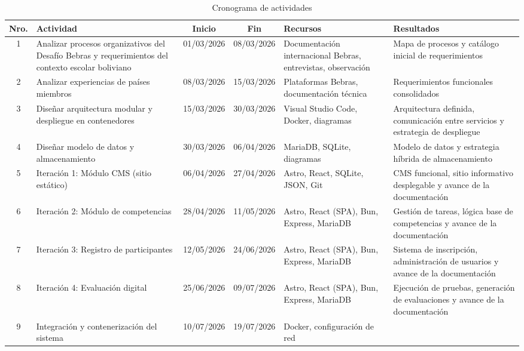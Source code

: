 \begin{table}[H]
    \centering
    \caption{Cronograma de actividades}
    \label{tab:cronograma}
    \small
    \begin{tabular}{|c|p{3.5cm}|c|c|p{3cm}|p{3.5cm}|}
    \hline
    \textbf{Nro.} & \textbf{Actividad} & \textbf{Inicio} & \textbf{Fin} & 
    \textbf{Recursos} & \textbf{Resultados} \\
    \hline
    1 & Analizar procesos organizativos del Desafío Bebras y requerimientos del contexto escolar boliviano &
    01/03/2026 & 08/03/2026 &
    Documentación internacional Bebras, entrevistas, observación &
    Mapa de procesos y catálogo inicial de requerimientos \\
    \hline
    2 & Analizar experiencias de países miembros & 
    08/03/2026 & 15/03/2026 & 
    Plataformas Bebras, documentación técnica & 
    Requerimientos funcionales consolidados \\
    \hline
    3 & Diseñar arquitectura modular y despliegue en contenedores & 
    15/03/2026 & 30/03/2026 & 
    Visual Studio Code, Docker, diagramas & 
    Arquitectura definida, comunicación entre servicios y estrategia de despliegue \\
    \hline
    4 & Diseñar modelo de datos y almacenamiento &
    30/03/2026 & 06/04/2026 &
    MariaDB, SQLite, diagramas &
    Modelo de datos y estrategia híbrida de almacenamiento \\
    \hline
    5 & Iteración 1: Módulo CMS (sitio estático) &
    06/04/2026 & 27/04/2026 &
    Astro, React, SQLite, JSON, Git &
    CMS funcional, sitio informativo desplegable y avance de la documentación \\
    \hline
    6 & Iteración 2: Módulo de competencias &
    28/04/2026 & 11/05/2026 &
    Astro, React (SPA), Bun, Express, MariaDB &
    Gestión de tareas, lógica base de competencias y avance de la documentación \\
    \hline
    7 & Iteración 3: Registro de participantes &
    12/05/2026 & 24/06/2026 &
    Astro, React (SPA), Bun, Express, MariaDB &
    Sistema de inscripción, administración de usuarios y avance de la documentación \\
    \hline
    8 & Iteración 4: Evaluación digital &
    25/06/2026 & 09/07/2026 &
    Astro, React (SPA), Bun, Express, MariaDB &
    Ejecución de pruebas, generación de evaluaciones y avance de la documentación \\
    \hline
    9 & Integración y contenerización del sistema &
    10/07/2026 & 19/07/2026 &
    Docker, configuración de red &

\end{tabular}
\end{table}
